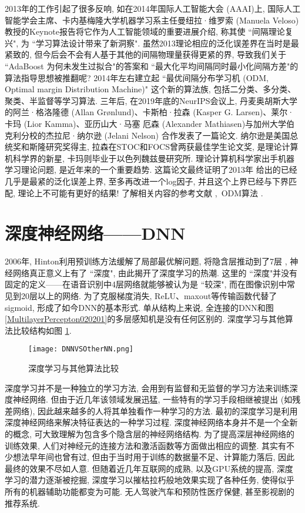 2013年的工作引起了很多反响, 如在2014年国际人工智能大会 (AAAI)上, 国际人工智能学会主席、卡内基梅隆大学机器学习系主任曼纽拉·维罗索 (Manuela Veloso) 教授的Keynote报告将它作为人工智能领域的重要进展介绍, 称其使 ``间隔理论复兴", 为 ``学习算法设计带来了新洞察".
虽然2013理论相应的泛化误差界在当时是最紧致的, 但今后会不会有人基于其他的间隔物理量获得更紧的界, 导致我们关于  ``AdaBoost 为何未发生过拟合"的答案和 ``最大化平均间隔同时最小化间隔方差"的算法指导思想被推翻呢?
2014年左右建立起 ``最优间隔分布学习机 (ODM, Optimal margin Distribution Machine)" 这个新的算法族, 包括二分类、多分类、聚类、半监督等学习算法. 
三年后, 在2019年底的NeurIPS会议上, 丹麦奥胡斯大学的阿兰·格洛隆德 (Allan Grønlund)、卡斯柏·拉森 (Kasper G. Larsen)、莱尔·卡玛 (Lior Kamma)、亚历山大·马塞 厄森 (Alexander Mathiasen)与加州大学伯克利分校的杰拉尼·纳尔逊 (Jelani Nelson) 合作发表了一篇论文.
纳尔逊是美国总统奖和斯隆研究奖得主, 拉森在STOC和FOCS曾两获最佳学生论文奖, 是理论计算机科学界的新星, 卡玛则毕业于以色列魏兹曼研究所.
理论计算机科学家出手机器学习理论问题, 是近年来的一个重要趋势.
这篇论文最终证明了2013年 \cite{ZhouDBLP} 给出的已经几乎是最紧的泛化误差上界, 至多再改进一个log因子, 并且这个上界已经与下界匹配, 理论上不可能有更好的结果!
了解相关内容的参考文献 \cite{Zhou978-3-319-11656-3-1},\, ODM算法 \cite{Zhang2020-8638559,NIPS2019-9365}.
\section{深度神经网络——DNN}
2006年, Hinton利用预训练方法缓解了局部最优解问题, 将隐含层推动到了7层 \cite{Hinton2006-9587}, 神经网络真正意义上有了 ``深度", 由此揭开了深度学习的热潮.
这里的 ``深度"并没有固定的定义——在语音识别中4层网络就能够被认为是 ``较深", 而在图像识别中常见到20层以上的网络.
为了克服梯度消失, ReLU、maxout等传输函数代替了sigmoid, 形成了如今DNN的基本形式.
单从结构上来说, 全连接的DNN和图 \ref{MultilayerPercepton020201}的多层感知机是没有任何区别的.
深度学习与其他算法比较结构如图 \ref{DNNVSOtherNN}.
\begin{figure}[htbp]
\vspace{-0.4cm}
    \centering
    \texttt{[image: DNNVSOtherNN.png]}
    \caption{深度学习与其他算法比较}
    \label{DNNVSOtherNN}
\end{figure}
深度学习并不是一种独立的学习方法, 会用到有监督和无监督的学习方法来训练深度神经网络.
但由于近几年该领域发展迅猛, 一些特有的学习手段相继被提出 (如残差网络), 因此越来越多的人将其单独看作一种学习的方法.
最初的深度学习是利用深度神经网络来解决特征表达的一种学习过程.
深度神经网络本身并不是一个全新的概念, 可大致理解为包含多个隐含层的神经网络结构.
为了提高深层神经网络的训练效果, 人们对神经元的连接方法和激活函数等方面做出相应的调整.
其实有不少想法早年间也曾有过, 但由于当时用于训练的数据量不足、计算能力落后, 因此最终的效果不尽如人意.
但随着近几年互联网的成熟, 以及GPU系统的提高, 深度学习的潜力逐渐被挖掘, 深度学习以摧枯拉朽般地效果实现了各种任务, 使得似乎所有的机器辅助功能都变为可能.
无人驾驶汽车和预防性医疗保健, 甚至影视剧的推荐系统.

